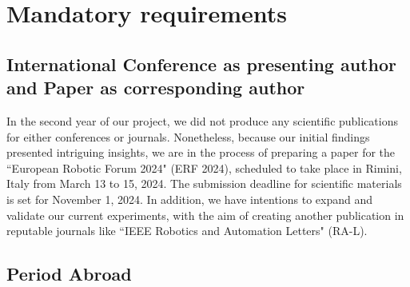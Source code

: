 \section{Mandatory requirements}

\subsection{International Conference as presenting author and Paper as corresponding author}
In the second year of our project, we did not produce any scientific publications for either conferences or journals. Nonetheless, because our initial findings presented intriguing insights, we are in the process of preparing a paper for the ``European Robotic Forum 2024" (ERF 2024), scheduled to take place in Rimini, Italy from March 13 to 15, 2024. The submission deadline for scientific materials is set for November 1, 2024.
In addition, we have intentions to expand and validate our current experiments, with the aim of creating another publication in reputable journals like ``IEEE Robotics and Automation Letters" (RA-L).

\subsection{Period Abroad}